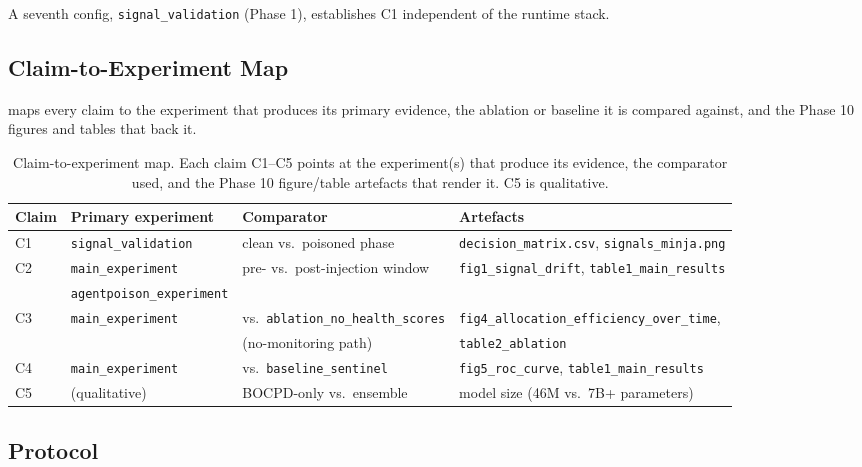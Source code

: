 A seventh config, \texttt{signal\_validation} (Phase 1), establishes
C1 independent of the runtime stack.

\subsection{Claim-to-Experiment Map}
\label{sec:experiments:map}

 maps every claim to the experiment that produces
its primary evidence, the ablation or baseline it is compared
against, and the Phase 10 figures and tables that back it.

\begin{table}[tbp]
  \centering
  \small
  \caption{Claim-to-experiment map. Each claim C1--C5 points at the
  experiment(s) that produce its evidence, the comparator used, and
  the Phase 10 figure/table artefacts that render it. C5 is
  qualitative.}
  \label{tab:claim-map}
  \begin{tabular}{@{}llll@{}}
    \toprule
    Claim & Primary experiment & Comparator & Artefacts \\
    \midrule
    C1 & \texttt{signal\_validation} & clean vs.\ poisoned phase
       & \texttt{decision\_matrix.csv}, \texttt{signals\_minja.png} \\
    C2 & \texttt{main\_experiment}
       & pre- vs.\ post-injection window
       & \texttt{fig1\_signal\_drift}, \texttt{table1\_main\_results} \\
     & \texttt{agentpoison\_experiment} & & \\
    C3 & \texttt{main\_experiment}
       & vs.\ \texttt{ablation\_no\_health\_scores}
       & \texttt{fig4\_allocation\_efficiency\_over\_time}, \\
     & & (no-monitoring path) & \texttt{table2\_ablation} \\
    C4 & \texttt{main\_experiment}
       & vs.\ \texttt{baseline\_sentinel}
       & \texttt{fig5\_roc\_curve}, \texttt{table1\_main\_results} \\
    C5 & (qualitative)
       & BOCPD-only vs.\ ensemble
       & model size (46M vs.\ 7B+ parameters) \\
    \bottomrule
  \end{tabular}
\end{table}

\subsection{Protocol}
\label{sec:experiments:protocol}

